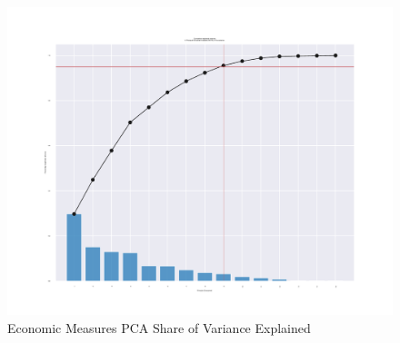 \documentclass[12pt]{article}
\begin{document}
    \begin{figure}[h!]
        \centering
        \caption{Economic Measures PCA Share of Variance Explained}
        \label{Econ_Share_Explained}	
        \includegraphics[width=\linewidth,keepaspectratio=true]{../Output/Figures/Econ_Indicator_Share_Explained.pdf}
    \end{figure}
\end{document}
